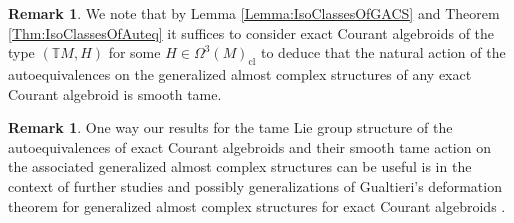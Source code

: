 \documentclass[12pt,a4paper]{article}
\theoremstyle{plain}
\theoremstyle{definition}
\newtheorem{remark}[theorem]{Remark}
\newcommand{\Forms}[1]{\Omega^{#1}(M)}
\newcommand{\ClForms}[1]{\Forms{#1}_{\mathrm{cl}}}
\newcommand{\GenTM}{\mathbb TM}
\begin{document}
\begin{remark}
We note that by Lemma \ref{Lemma:IsoClassesOfGACS} and Theorem \ref{Thm:IsoClassesOfAuteq} it suffices to consider exact Courant algebroids of the type $(\GenTM,H)$ for some $H\in \ClForms{3}$ to deduce that the natural action of the autoequivalences on the generalized almost complex structures of any exact Courant algebroid is smooth tame.
\end{remark}


\begin{remark}
One way our results for the tame Lie group structure of the autoequivalences of exact Courant algebroids and their smooth tame action on the associated generalized almost complex structures can be useful is in the context of further studies and possibly generalizations of Gualtieri's deformation theorem for generalized almost complex structures for exact Courant algebroids \cite[Theorem 5.4]{gualtieri}.    
\end{remark}
\end{document}
